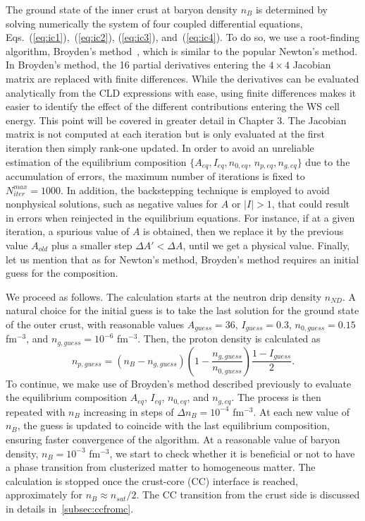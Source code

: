 The ground state of the inner crust at baryon density $n_B$ 
is determined by solving numerically the system of four coupled
differential equations, Eqs.~(\ref{eq:ic1}),~(\ref{eq:ic2}), (\ref{eq:ic3}),
and~(\ref{eq:ic4}). To do so, we use a root-finding algorithm, Broyden's
method~\cite{Broyden1965}, which is similar to the popular Newton's method. In 
Broyden's method, the 16 partial derivatives entering the $4\times 4$ Jacobian 
matrix are replaced with finite differences. While the derivatives can be
evaluated analytically from the CLD expressions with ease, using finite
differences makes it {easier to identify the effect of the different 
contributions entering the WS cell energy. This point will be covered in
greater detail in Chapter 3.} The Jacobian matrix 
is not computed at each iteration but is only evaluated at the first iteration 
then simply rank-one updated. In order to avoid an unreliable estimation of the
equilibrium composition $\{A_{eq},I_{eq},n_{0,eq}$, $n_{p,eq},n_{g,eq}\}$ due to
the accumulation of errors, the maximum number of iterations is fixed to
$N_{iter}^{max} = 1000$.
In addition, the backstepping technique is employed to avoid nonphysical solutions,
such as negative values for $A$ or $|I| > 1$, that could result in
errors when reinjected in the equilibrium equations. For instance, if at a given 
iteration, a spurious value of $A$ is obtained, then we replace it by the
previous value $A_{old}$ plus a smaller step $\Delta A' < \Delta A$, until we 
get a physical value. Finally, let us mention that as for Newton's 
method, Broyden's method requires an initial guess for the composition.

We proceed as follows. The calculation starts at the neutron drip density
$n_{ND}$. {A natural choice for the initial guess is to take} the last 
  solution for the ground state of the outer crust, with reasonable values 
$A_{guess} = 36$, $I_{guess} = 0.3$, $n_{0,guess} = 0.15$ fm$^{-3}$, and 
$n_{g,guess} = 10^{-6}$ fm$^{-3}$. Then, the proton density is calculated
as
%
\begin{equation}
  n_{p,guess} =
  (n_B-n_{g,guess})\left(1-\frac{n_{g,guess}}{n_{0,guess}}\right)
  \frac{1-I_{guess}}{2}.
\end{equation}
%
To continue, we make use of Broyden's method described previously to evaluate 
the equilibrium composition $A_{eq}$, $I_{eq}$, $n_{0,eq}$, and $n_{g,eq}$. The
process is then repeated with $n_B$ increasing in steps of 
$\Delta n_B = 10^{-4}$ fm$^{-3}$. At each new value of $n_B$, the guess
is updated to coincide with the last equilibrium composition, ensuring faster
convergence of the algorithm. At a reasonable value of baryon density, $n_B =
10^{-3}$ fm$^{-3}$, we start to check whether it is beneficial or not to have a
phase transition from clusterized matter to homogeneous matter. The calculation 
is stopped once the crust-core (CC) interface is reached, approximately for $n_B
\approx n_{sat}/2$. The CC transition from the crust side is discussed 
in details in~\ref{subsec:ccfromc}.


